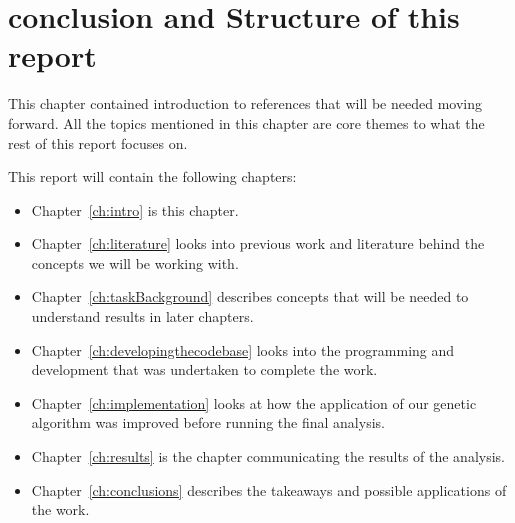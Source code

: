 \section{conclusion and Structure of this report}
This chapter contained introduction to references that will be needed moving forward. 
All the topics mentioned in this chapter are core themes to what the rest of this report focuses on.

This report will contain the following chapters:
\begin{itemize}
    \item Chapter~\ref{ch:intro} is this chapter.
    \item Chapter~\ref{ch:literature} looks into previous work and literature behind the concepts we will be working with.
    \item Chapter~\ref{ch:taskBackground} describes concepts that will be needed to understand results in later chapters.
    \item Chapter~\ref{ch:developingthecodebase} looks into the programming and development that was undertaken to complete the work.
    \item Chapter~\ref{ch:implementation} looks at how the application of our genetic algorithm was improved before running the final analysis.
    \item Chapter~\ref{ch:results} is the chapter communicating the results of the analysis.
    \item Chapter~\ref{ch:conclusions} describes the takeaways and possible applications of the work.
\end{itemize}